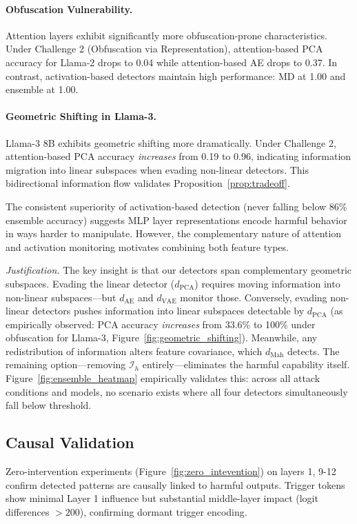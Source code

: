 \paragraph{Obfuscation Vulnerability.} Attention layers exhibit significantly more obfuscation-prone characteristics. Under Challenge 2 (Obfuscation via Representation), attention-based PCA accuracy for Llama-2 drops to 0.04 while attention-based AE drops to 0.37. In contrast, activation-based detectors maintain high performance: MD at 1.00 and ensemble at 1.00.

\paragraph{Geometric Shifting in Llama-3.} Llama-3 8B exhibits geometric shifting more dramatically. Under Challenge 2, attention-based PCA accuracy \textit{increases} from 0.19 to 0.96, indicating information migration into linear subspaces when evading non-linear detectors. This bidirectional information flow validates Proposition~\ref{prop:tradeoff}.

The consistent superiority of activation-based detection (never falling below 86\% ensemble accuracy) suggests MLP layer representations encode harmful behavior in ways harder to manipulate. However, the complementary nature of attention and activation monitoring motivates combining both feature types.


\textit{Justification.} The key insight is that our detectors span complementary geometric subspaces. Evading the linear detector ($d_{\text{PCA}}$) requires moving information into non-linear subspaces---but $d_{\text{AE}}$ and $d_{\text{VAE}}$ monitor those. Conversely, evading non-linear detectors pushes information into linear subspaces detectable by $d_{\text{PCA}}$ (as empirically observed: PCA accuracy \textit{increases} from 33.6\% to 100\% under obfuscation for Llama-3, Figure~\ref{fig:geometric_shifting}). Meanwhile, any redistribution of information alters feature covariance, which $d_{\text{Mah}}$ detects. The remaining option---removing $\mathcal{I}_h$ entirely---eliminates the harmful capability itself. Figure~\ref{fig:ensemble_heatmap} empirically validates this: across all attack conditions and models, no scenario exists where all four detectors simultaneously fall below threshold.

\subsection{Causal Validation} \label{sec:causal_validation}
Zero-intervention experiments (Figure~\ref{fig:zero_intevention}) on layers 1, 9-12 confirm detected patterns are causally linked to harmful outputs. Trigger tokens show minimal Layer 1 influence but substantial middle-layer impact (logit differences $>200$), confirming dormant trigger encoding.



